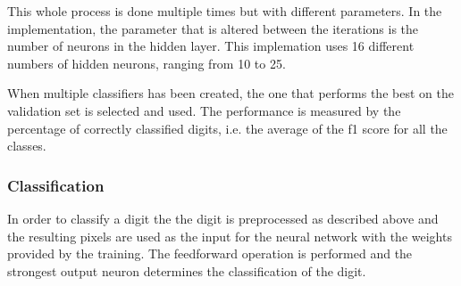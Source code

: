 \documentclass[report.tex]{subfile}
\begin{document}
This whole process is done multiple times but with different parameters. In the
implementation, the parameter that is altered between the iterations is the
number of neurons in the hidden layer. This implemation uses 16 different
numbers of hidden neurons, ranging from 10 to 25. 

When multiple classifiers has been created, the one that performs the best on
the validation set is selected and used. The performance is measured by the
percentage of correctly classified digits, i.e. the average of the f1 score for
all the classes.

\subsubsection{Classification}
In order to classify a digit the the digit is preprocessed as described above
and the resulting pixels are used as the input for the neural network with the
weights provided by the training. The feedforward operation is performed and
the strongest output neuron determines the classification of the digit.
\end{document}
